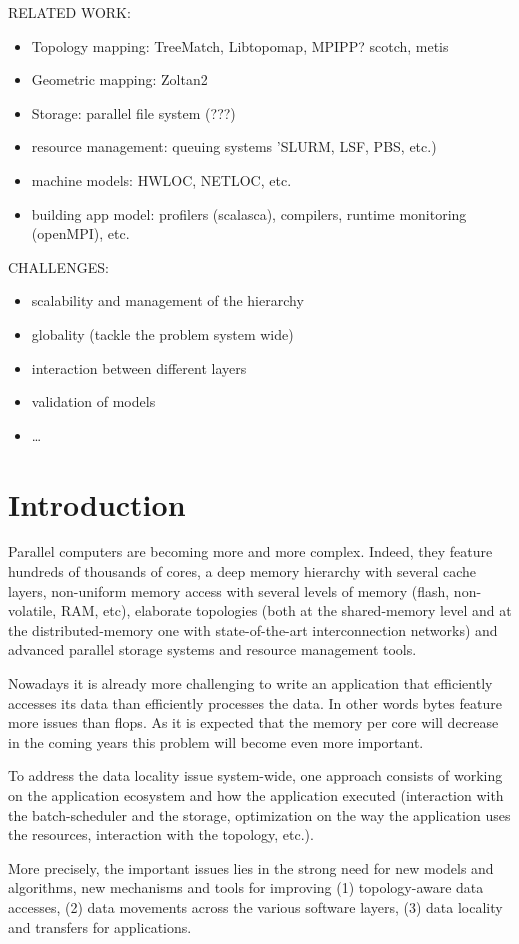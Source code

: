 RELATED WORK: 

\begin{itemize}
\item Topology mapping: TreeMatch, Libtopomap, MPIPP? scotch, metis  
\item Geometric mapping: Zoltan2
\item Storage: parallel file system (???)
\item resource management: queuing systems 'SLURM, LSF, PBS, etc.)
\item machine models: HWLOC, NETLOC, etc. 
\item building app model: profilers (scalasca), compilers, runtime monitoring (openMPI), etc. 
\end{itemize}

CHALLENGES:
\begin{itemize}
\item scalability and management of the hierarchy
\item globality (tackle the problem system wide)
\item interaction between different layers
\item validation of models
\item \ldots
\end{itemize}


\section{Introduction}
 

Parallel computers are becoming more and more complex. 
Indeed, they feature hundreds of thousands of cores, a deep memory hierarchy with 
several cache layers, non-uniform memory access with  several levels of memory (flash,
non-volatile, RAM, etc), elaborate topologies (both at the
shared-memory level and at the distributed-memory one with state-of-the-art
interconnection networks) and advanced parallel storage systems and resource
management tools.

Nowadays it is already more challenging to write an application that efficiently
accesses its data than efficiently processes the data. In other words bytes 
feature more issues than flops. As it is expected that the memory
per core will decrease in the coming years this problem will become even
more important. 

To address the data locality issue system-wide, one approach consists of
working on the application ecosystem and how the application executed (interaction
with the batch-scheduler and the storage, optimization on the way the
application uses the resources, interaction with the topology, etc.). 

More precisely, the important issues lies in the strong need for new models and algorithms, new 
mechanisms and tools for improving (1) topology-aware data accesses, (2) data 
movements across the various software layers, (3) data locality and transfers for 
applications. 
